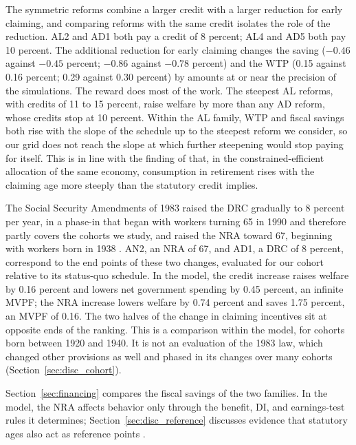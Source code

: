The symmetric reforms combine a larger credit with a larger reduction for early claiming, and comparing reforms with the same credit isolates the role of the reduction. AL2 and AD1 both pay a credit of 8 percent; AL4 and AD5 both pay 10 percent. The additional reduction for early claiming changes the saving ($-0.46$ against $-0.45$ percent; $-0.86$ against $-0.78$ percent) and the WTP (0.15 against 0.16 percent; 0.29 against 0.30 percent) by amounts at or near the precision of the simulations. The reward does most of the work. The steepest AL reforms, with credits of 11 to 15 percent, raise welfare by more than any AD reform, whose credits stop at 10 percent. Within the AL family, WTP and fiscal savings both rise with the slope of the schedule up to the steepest reform we consider, so our grid does not reach the slope at which further steepening would stop paying for itself. This is in line with the finding of \citet{NdiayeYu2026frot} that, in the constrained-efficient allocation of the same economy, consumption in retirement rises with the claiming age more steeply than the statutory credit implies.

The Social Security Amendments of 1983 raised the DRC gradually to 8 percent per year, in a phase-in that began with workers turning 65 in 1990 and therefore partly covers the cohorts we study, and raised the NRA toward 67, beginning with workers born in 1938 \citep{Svahn1983social}. AN2, an NRA of 67, and AD1, a DRC of 8 percent, correspond to the end points of these two changes, evaluated for our cohort relative to its status-quo schedule. In the model, the credit increase raises welfare by 0.16 percent and lowers net government spending by 0.45 percent, an infinite MVPF; the NRA increase lowers welfare by 0.74 percent and saves 1.75 percent, an MVPF of 0.16. The two halves of the change in claiming incentives sit at opposite ends of the ranking. This is a comparison within the model, for cohorts born between 1920 and 1940. It is not an evaluation of the 1983 law, which changed other provisions as well and phased in its changes over many cohorts (Section~\ref{sec:disc_cohort}).

Section~\ref{sec:financing} compares the fiscal savings of the two families. In the model, the NRA affects behavior only through the benefit, DI, and earnings-test rules it determines; Section~\ref{sec:disc_reference} discusses evidence that statutory ages also act as reference points \citep{seibold2021reference}.

